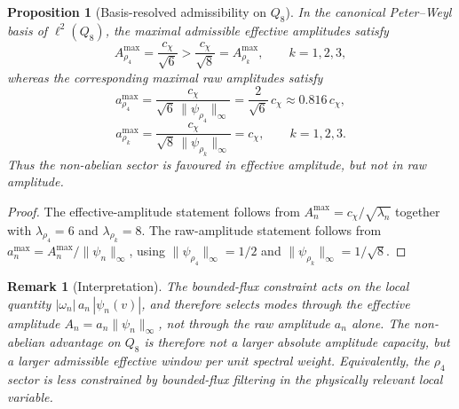 \documentclass[11pt,a4paper]{article}
\newtheorem{proposition}{Proposition}
\newtheorem{remark}{Remark}
\begin{document}
    \begin{proposition}[Basis-resolved admissibility on $Q_8$]
      \label{prop:basis-resolved}
      In the canonical Peter--Weyl basis of $\ell^2(Q_8)$, the maximal admissible
      effective amplitudes satisfy
      \begin{equation}
        A_{\rho_4}^{\max}
        =
        \frac{c_\chi}{\sqrt{6}}
        >
        \frac{c_\chi}{\sqrt{8}}
        =
        A_{\rho_k}^{\max},
        \qquad
        k=1,2,3,
      \end{equation}
      whereas the corresponding maximal raw amplitudes satisfy
      \begin{equation}
        a_{\rho_4}^{\max}
        =
        \frac{c_\chi}{\sqrt{6}\,\|\psi_{\rho_4}\|_\infty}
        =
        \frac{2}{\sqrt{6}}\,c_\chi
        \approx 0.816\,c_\chi,
      \end{equation}
      \begin{equation}
        a_{\rho_k}^{\max}
        =
        \frac{c_\chi}{\sqrt{8}\,\|\psi_{\rho_k}\|_\infty}
        =
        c_\chi,
        \qquad
        k=1,2,3.
      \end{equation}
      Thus the non-abelian sector is favoured in effective amplitude, but not in raw
      amplitude.
    \end{proposition}

    \begin{proof}
      The effective-amplitude statement follows from
      $A_n^{\max} = c_\chi/\sqrt{\lambda_n}$ together with
      $\lambda_{\rho_4} = 6$ and $\lambda_{\rho_k} = 8$.
      The raw-amplitude statement follows from
      $a_n^{\max} = A_n^{\max}/\|\psi_n\|_\infty$, using
      $\|\psi_{\rho_4}\|_\infty = 1/2$ and
      $\|\psi_{\rho_k}\|_\infty = 1/\sqrt{8}$.
    \end{proof}

    \begin{remark}[Interpretation]
        The bounded-flux constraint acts on the local quantity
        $|\omega_n|\,a_n\,|\psi_n(v)|$, and therefore selects modes through the effective
        amplitude $A_n = a_n \|\psi_n\|_\infty$, not through the raw amplitude $a_n$ alone.
        The non-abelian advantage on $Q_8$ is therefore not a larger absolute amplitude
        capacity, but a larger admissible effective window per unit spectral weight.
        Equivalently, the $\rho_4$ sector is less constrained by bounded-flux filtering
        in the physically relevant local variable.
    \end{remark}
\end{document}
